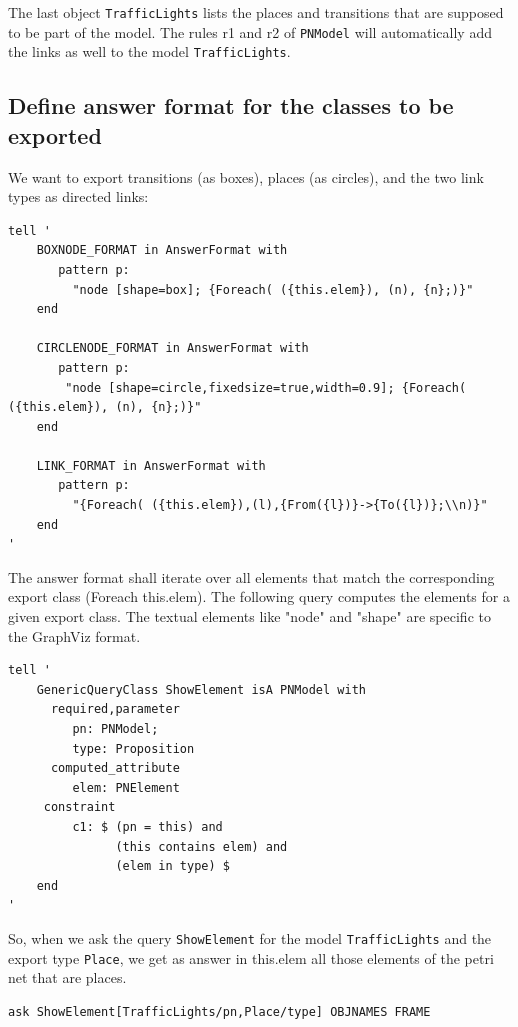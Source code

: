 \documentclass[10pt,a4paper]{article}
\begin{document}
The last object {\tt TrafficLights} lists the places and transitions that are supposed to be
part of the model. The rules r1 and r2 of {\tt PNModel} will automatically add the links as
well to the model {\tt TrafficLights}.



\subsection{Define answer format for the classes to be exported}

We want to export transitions (as boxes), places (as circles), and the two link types
as directed links:

\begin{verbatim}
tell '
    BOXNODE_FORMAT in AnswerFormat with
       pattern p:
         "node [shape=box]; {Foreach( ({this.elem}), (n), {n};)}"
    end

    CIRCLENODE_FORMAT in AnswerFormat with
       pattern p: 
        "node [shape=circle,fixedsize=true,width=0.9]; {Foreach( ({this.elem}), (n), {n};)}"
    end

    LINK_FORMAT in AnswerFormat with
       pattern p: 
         "{Foreach( ({this.elem}),(l),{From({l})}->{To({l})};\\n)}"
    end
'
\end{verbatim}


The answer format shall iterate over all elements that match the corresponding export class
(Foreach this.elem). The following query computes the elements for a given export class.
The textual elements like "node" and "shape" are specific to the GraphViz format.



\begin{verbatim}
tell '
    GenericQueryClass ShowElement isA PNModel with
      required,parameter
         pn: PNModel;
         type: Proposition
      computed_attribute
         elem: PNElement
     constraint
         c1: $ (pn = this) and
               (this contains elem) and
               (elem in type) $
    end
'
\end{verbatim}

So, when we ask the query {\tt ShowElement} for the model {\tt TrafficLights}  and the export type {\tt Place},
we get as answer in this.elem all those elements of the petri net that are places.

\begin{verbatim}
ask ShowElement[TrafficLights/pn,Place/type] OBJNAMES FRAME
\end{verbatim}
\end{document}

